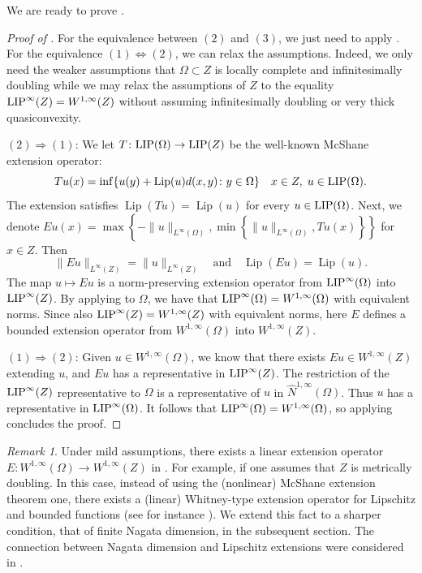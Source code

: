 \documentclass[reqno]{amsart}
\newcommand{\LIP}{{\rm LIP}}
\numberwithin{equation}{section}
\theoremstyle{remark}
\newtheorem{remark}[theorem]{Remark}
\DeclareMathOperator{\lip}{Lip}
\begin{document}
We are ready to prove .
\begin{proof}[Proof of ]
For the equivalence between $(2)$ and $(3)$, we just need to apply . For the equivalence $(1)\Leftrightarrow (2)$, we can relax the assumptions. Indeed, we only need the weaker assumptions that $\Omega\subset Z$ is locally complete and infinitesimally doubling while we may relax the assumptions of $Z$ to the equality $\LIP^{\infty}(Z) = W^{1,\infty}(Z)$ without assuming infinitesimally doubling or very thick quasiconvexity.

$(2)\Rightarrow (1)$: We let $T\colon\LIP(\Omega)\to\LIP(Z)$ be the well-known McShane extension operator:
$$ T u(x)= \inf\{ u(y)+\lip(u) d(x,y)\colon y\in\Omega\}  \quad  x\in Z,\; u\in \LIP(\Omega).$$
The extension satisfies $\lip(Tu)=\lip(u)$ for every $u\in \LIP(\Omega)$. Next, we denote $Eu(x) = \max\left\{ -\|u\|_{L^{\infty}(\Omega)}, \min\left\{ \|u\|_{L^{\infty}(\Omega)}, Tu(x) \right\} \right\}$ for $x \in Z$. Then $$\| Eu \|_{L^{\infty}(Z)} = \|u\|_{L^{\infty}(Z)} \quad \text{and} \quad \lip(Eu) = \lip(u).$$ The map $u \mapsto Eu$ is a norm-preserving extension operator from $\LIP^{\infty}(\Omega)$ into $\LIP^{\infty}(Z)$. By applying  to $\Omega$, we have that $\LIP^{\infty}(\Omega) = W^{1,\infty}(\Omega)$ with equivalent norms. Since also $\LIP^{\infty}(Z) = W^{1,\infty}(Z)$ with equivalent norms, here $E$ defines a bounded extension operator from $W^{1,\infty}(\Omega)$ into $W^{1,\infty}(Z)$.

$(1)\Rightarrow (2)$: Given $u \in W^{1,\infty}(\Omega)$, we know that there exists $Eu \in W^{1,\infty}(Z)$ extending $u$, and $Eu$ has a representative in $\LIP^{\infty}(Z)$. The restriction of the $\LIP^{\infty}(Z)$ representative to $\Omega$ is a representative of $u$ in $\widehat{N}^{1,\infty}(\Omega)$. Thus $u$ has a representative in $\LIP^{\infty}(\Omega)$. It follows that $\LIP^{\infty}(\Omega) = W^{1,\infty}(\Omega)$, so applying  concludes the proof.
\end{proof}


\begin{remark}\label{rem:linear_ext}
Under mild assumptions, there exists a linear extension operator $E\colon W^{1,\infty}(\Omega)\to W^{1,\infty}(Z)$ in . For example, if one assumes that $Z$ is metrically doubling. In this case, instead of using the (nonlinear) McShane extension theorem one, there exists a (linear) Whitney-type extension operator for Lipschitz and bounded functions (see for instance \cite[Theorem 4.1.21]{HKST2015}). We extend this fact to a sharper condition, that of finite Nagata dimension, in the subsequent section. The connection between Nagata dimension and Lipschitz extensions were considered in \cite{La:Sch:05}.
\end{remark}
\end{document}
